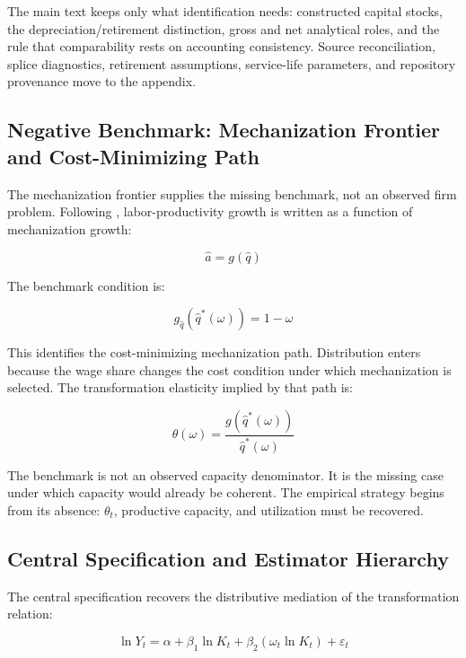 The main text keeps only what identification needs: constructed capital stocks, the depreciation/retirement distinction, gross and net analytical roles, and the rule that comparability rests on accounting consistency. Source reconciliation, splice diagnostics, retirement assumptions, service-life parameters, and repository provenance move to the appendix.



\subsection{Negative Benchmark: Mechanization Frontier and Cost-Minimizing Path}

The mechanization frontier supplies the missing benchmark, not an observed firm problem. Following \citet{Cajas2024}, labor-productivity growth is written as a function of mechanization growth:

\begin{equation}
\hat a = g(\hat q)
\end{equation}

The benchmark condition is:

\begin{equation}
g_{\hat q}(\hat q^*(\omega)) = 1-\omega
\end{equation}

This identifies the cost-minimizing mechanization path. Distribution enters because the wage share changes the cost condition under which mechanization is selected. The transformation elasticity implied by that path is:

\begin{equation}
\theta(\omega)
=
\frac{
g(\hat q^*(\omega))
}{
\hat q^*(\omega)
}
\end{equation}

The benchmark is not an observed capacity denominator. It is the missing case under which capacity would already be coherent. The empirical strategy begins from its absence: $\theta_t$, productive capacity, and utilization must be recovered.


\subsection{Central Specification and Estimator Hierarchy}

The central specification recovers the distributive mediation of the transformation relation:

\begin{equation}
\ln Y_t
=
\alpha
+
\beta_1 \ln K_t
+
\beta_2(\omega_t \ln K_t)
+
\varepsilon_t
\end{equation}

